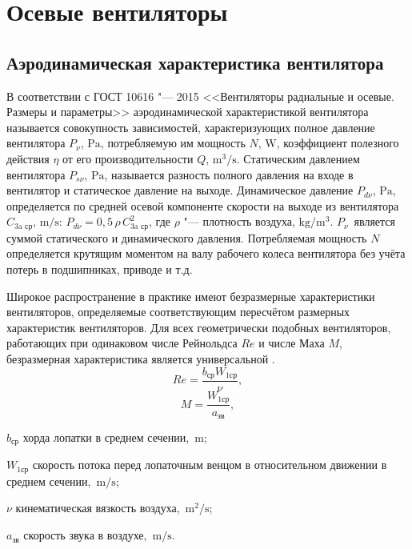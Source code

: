 \newcommand{\Ht}{\bar{H}_\text{т} }
\newcommand{\ca}{\bar{c}_{a} }


\chapter{Осевые вентиляторы}\label{ch:ch1}

\section{Аэродинамическая характеристика вентилятора}\label{sec:ch1/sec1}

В соответствии с ГОСТ 10616 "--- 2015 <<Вентиляторы радиальные и осевые. Размеры и параметры>> \cite{gost10616} аэродинамической характеристикой вентилятора называется совокупность зависимостей, характеризующих полное давление вентилятора \(P_\nu\), \(\si\pascal\), потребляемую им мощность \(N\), \(\si\watt\), коэффициент полезного действия \(\eta\) от его производительности \(Q\), $\si\meter^3/\si\second$.
Статическим давлением вентилятора \(P_{s\nu}\), \(\si\pascal\), называется разность полного давления на входе в вентилятор и статическое давление на выходе. 
Динамическое давление \(P_{d\nu}\), \(\si\pascal\), определяется по средней осевой компоненте скорости на выходе из вентилятора \(C_\text{3a ср}\), \(\si\meter/\si\second\): \(P_{d\nu} = 0,5\, \rho\, C_\text{3a ср}^2\), где \(\rho\) "--- плотность воздуха, \(\si\kilogram/\si\meter^3\).
\(P_\nu\)~является суммой статического и динамического давления. 
Потребляемая мощность \(N\) определяется крутящим моментом на валу рабочего колеса вентилятора без учёта потерь в подшипниках, приводе и т.д. 

Широкое распространение в практике имеют безразмерные характеристики вентиляторов, определяемые соответствующим пересчётом размерных характеристик вентиляторов. Для всех геометрически подобных вентиляторов, работающих при одинаковом числе Рейнольдса \(Re\) и числе Маха \(M\), безразмерная характеристика является универсальной \cite{Brusilovskiy1984}. 
\begin{equation}
	Re = \frac{b_{\text{ср}} W_{1\text{ср}}}{\nu},
\end{equation}
\begin{equation}
	M = \frac{W_{1\text{ср}}}{a_{\text{зв}}},
\end{equation}
\begin{eqexpl} 
\item{\(b_{\text{ср}}\)} хорда лопатки в среднем сечении,~$\si\meter$;
\item{\(W_{1\text{ср}}\)} скорость потока перед лопаточным венцом в относительном движении в среднем сечении,~$\si\meter/\si\second$;
\item{\(\nu\)} кинематическая вязкость воздуха,~$\si\meter^2/\si\second$;
\item{\(a_{\text{зв}}\)} скорость звука в воздухе,~$\si\meter/\si\second$.
\end{eqexpl}


